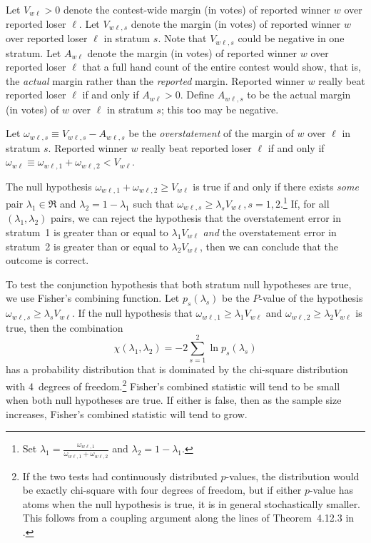\documentclass[runningheads]{llncs}
\newcommand{\beq}{\begin{equation}}
\newcommand{\eeq}{\end{equation}}
\begin{document}
Let $V_{w\ell} > 0$ denote the contest-wide margin (in votes) of reported winner 
$w$ over reported loser
$\ell$.
Let $V_{w\ell,s}$ denote the margin (in votes) of reported winner $w$ over reported loser $\ell$
in stratum $s$. 
Note that $V_{w\ell,s}$ could be negative in one stratum.
Let $A_{w\ell}$ denote the margin (in votes)
of reported winner $w$ over reported loser $\ell$ that 
a full hand count of the entire contest would show, that is, the \emph{actual} margin rather
than the \emph{reported} margin.
Reported winner $w$ really beat reported loser $\ell$ if and only if $A_{w\ell} > 0$.
Define $A_{w\ell,s}$ to be the actual margin (in votes) of $w$ over $\ell$ in stratum $s$;
this too may be negative.

Let $\omega_{w\ell,s} \equiv V_{w\ell,s} - A_{w\ell,s}$ be the \emph{overstatement}
of the margin of $w$ over $\ell$ in stratum $s$.
Reported winner $w$ really beat reported loser 
$\ell$ if and only if $\omega_{w\ell} \equiv \omega_{w\ell,1} + \omega_{w\ell,2} < V_{w\ell}$.

The null hypothesis $\omega_{w\ell, 1} + \omega_{w\ell, 2} \ge V_{w\ell}$ is true if and only if there exists \textit{some} pair $\lambda_1 \in \Re$ and $\lambda_2 = 1-\lambda_1$ such that $\omega_{w\ell, s}\ge \lambda_s V_{w\ell}, s=1, 2$.\footnote{
Set $\lambda_1 = \frac{\omega_{w\ell, 1}}{\omega_{w\ell, 1}+\omega_{w\ell, 2}}$ and $\lambda_2 = 1-\lambda_1$.
}
If, for all $(\lambda_1, \lambda_2)$ pairs, we can reject the hypothesis that the 
overstatement error in stratum~1 is greater than or equal to $\lambda_1 V_{w\ell}$ \emph{and} 
the overstatement error in stratum~2 is greater than or equal to $\lambda_2 V_{w\ell}$, then
we can conclude that the outcome is correct.

To test the conjunction hypothesis that both stratum null hypotheses are true, we use 
Fisher's combining function.
Let $p_s(\lambda_s)$ be the $P$-value of the hypothesis $\omega_{w\ell,s} \ge \lambda_s V_{w\ell}$.
If the null hypothesis that $\omega_{w\ell,1} \ge \lambda_1 V_{w\ell}$ and 
$\omega_{w\ell,2} \ge \lambda_2 V_{w\ell}$ is true, then the combination
\beq
   \chi(\lambda_1, \lambda_2) = -2 \sum_{s=1}^2 \ln p_s(\lambda_s)
\eeq
has a probability distribution that is dominated by the chi-square distribution with 4~degrees
of freedom.\footnote{%
   If the two tests had continuously distributed $p$-values, the distribution would be exactly
   chi-square with four degrees of freedom, but if either $p$-value has atoms when
   the null hypothesis is true, it is in general stochastically smaller.
   This follows from a coupling argument along the lines of Theorem~4.12.3 in \cite{grimmett01}.
}
Fisher's combined statistic will tend to be small when both null hypotheses are true.
If either is false, then as the sample size increases, Fisher's combined statistic will tend to grow.
\end{document}
